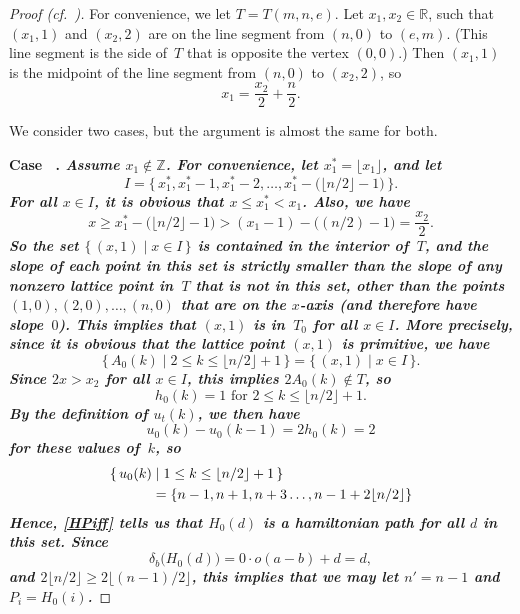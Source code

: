 \documentclass[11pt]{amsart}
\theoremstyle{definition}
\newcounter{case}
\newcounter{startcases}
\numberwithin{case}{startcases}
\newenvironment{case}[1][\unskip]{\refstepcounter{case}\bf
	\medskip \noindent Case \thecase\ #1. \it}{\unskip\upshape}
\renewcommand{\thecase}{\Roman{case}}
\numberwithin{equation}{section}
\newcommand{\R}{\mathbb{R}}  %
\newcommand{\Z}{\mathbb{Z}}  %
\begin{document}
	\begin{proof}[Proof \textup{(cf.\ \cite[(9.2) on p.~67, and Case~3 on p.~69]{Curran})}]
		For convenience, we let $T = T(m,n,e)$.
		Let $x_1,x_2 \in \R$, such that $(x_1,1)$ and $(x_2, 2)$ are on the line segment from $(n,0)$ to $(e,m)$. (This line segment is the side of~$T$ that is opposite the vertex $(0,0)$.) Then $(x_1, 1)$ is the midpoint of the line segment from $(n,0)$ to $(x_2, 2)$, so 
		\[ x_1 = \frac{x_2}{2} + \frac{n}{2} . \]
		
		We consider two cases, but the argument is almost the same for both.
		
		\begin{case} \label{stringPf-x1notinZ}
			Assume $x_1 \notin \Z$.
		\end{case}
		For convenience, let $x_1^* = \lfloor x_1 \rfloor$, and let 
		\[ I = \{\, x_1^*, x_1^* - 1, x_1^* - 2, \ldots, x_1^* - \bigl( \lfloor n/2 \rfloor - 1 \bigr) \,\} . \]
		For all $x \in I$, it is obvious that $x \le x_1^* < x_1$. Also, we have 
		\[ x 
		\ge x_1^* - \bigl( \lfloor n/2 \rfloor - 1 \bigr)
		> (x_1 - 1) - \bigl( (n/2) - 1 \bigr)
		= \frac{x_2}{2}
		.\]
		So the set $\{\, (x, 1) \mid x \in I\,\}$ is contained in the interior of~$T$, and the slope of each point in this set is strictly smaller than the slope of any nonzero lattice point in~$T$ that is not in this set, other than the points $(1,0), (2,0), \ldots, (n,0)$ that are on the $x$-axis (and therefore have slope~$0$). 
		This implies that $(x,1)$ is in~$T_0$ for all $x \in I$. More precisely, since it is obvious that the lattice point $(x,1)$ is primitive, we have
		\[ \{\, A_0(k) \mid 2 \le k \le \lfloor n/2 \rfloor + 1 \,\} = \{\, (x, 1) \mid x \in I\,\} . \]
		Since $2x > x_2$ for all $x \in I$, this implies $2A_0(k) \notin T$, so
		\[ \text{$h_0(k) = 1$ for $2 \le k \le \lfloor n/2 \rfloor + 1$} . \]
		By the definition of $u_t(k)$, we then have 
		\[ u_0(k) - u_0(k-1) = 2 h_0(k) = 2 \]
		for these values of~$k$, so
		\begin{align} \label{string-u0}
			\{\, u_0(k) & \mid 1 \le k \le \lfloor n/2 \rfloor + 1 \,\}
			\\&= \{ n-1, n+1, n + 3\ldots, n - 1 + 2 \lfloor n/2 \rfloor \}
			\notag
		\end{align}
		Hence, \cref{HPiff} tells us that $H_0(d)$ is a hamiltonian path for all $d$ in this set.
		Since 
		\[ \delta_b \bigl( H_0(d) \bigr)
		= 0 \cdot o(a - b) + d
		= d ,\]
		and $2 \lfloor n/2 \rfloor \ge 2 \lfloor (n - 1)/2 \rfloor$, this implies that we may let $n' = n-1$ and $P_i = H_0(i)$.
		

\end{proof}
\end{document}
